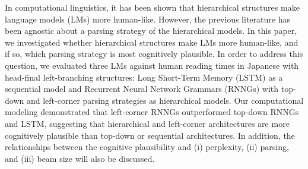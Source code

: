 In computational linguistics, it has been shown that hierarchical structures make language models (LMs) more human-like. However, the previous literature has been agnostic about a parsing strategy of the hierarchical models. In this paper, we investigated whether hierarchical structures make LMs more human-like, and if so, which parsing strategy is most cognitively plausible. In order to address this question, we evaluated three LMs against human reading times in Japanese with head-final left-branching structures: Long Short-Term Memory (LSTM) as a sequential model and Recurrent Neural Network Grammars (RNNGs) with top-down and left-corner parsing strategies as hierarchical models. Our computational modeling demonstrated that left-corner RNNGs outperformed top-down RNNGs and LSTM, suggesting that hierarchical and left-corner architectures are more cognitively plausible than top-down or sequential architectures. In addition, the relationships between the cognitive plausibility and (i) perplexity, (ii) parsing, and (iii) beam size will also be discussed.
